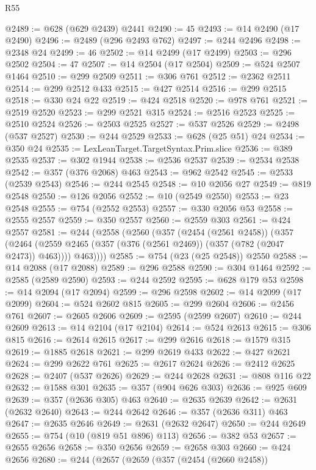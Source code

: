 \begin{lexlean}{R55}
\begin{coremodule}
@2489 := @628 (@629 @2439) @2441
@2490 := 45
@2493 := @14 @2490 (@17 @2490)
@2496 := @2489 (@296 @2493 @762)
@2497 := @244 @2496
@2498 := @2348 @24
@2499 := 46
@2502 := @14 @2499 (@17 @2499)
@2503 := @296 @2502
@2504 := 47
@2507 := @14 @2504 (@17 @2504)
@2509 := @524 @2507 @1464
@2510 := @299 @2509
@2511 := @306 @761
@2512 := @2362 @2511
@2514 := @299 @2512 @433
@2515 := @427 @2514
@2516 := @299 @2515
@2518 := @330 @24 @22
@2519 := @424 @2518
@2520 := @978 @761
@2521 := @2519 @2520
@2523 := @299 @2521 @315
@2524 := @2516 @2523
@2525 := @2510 @2524
@2526 := @2503 @2525
@2527 := @537 @2526
@2529 := @2498 (@537 @2527)
@2530 := @244 @2529
@2533 := @628 (@25 @51) @24
@2534 := @350 @24
@2535 := LexLeanTarget.TargetSyntax.Prim.slice
@2536 := @389 @2535
@2537 := @302 @1944
@2538 := @2536 @2537
@2539 := @2534 @2538
@2542 := @357 (@376 @2068) @463
@2543 := @962 @2542
@2545 := @2533 (@2539 @2543)
@2546 := @244 @2545
@2548 := @10 @2056 @27
@2549 := @819 @2548
@2550 := @126 @2056
@2552 := @10 (@2549 @2550)
@2553 := @23 @2548
@2555 := @754 (@2552 @2553)
@2557 := @330 @2056 @53
@2558 := @2555 @2557
@2559 := @350 @2557
@2560 := @2559 @303
@2561 := @424 @2557
@2581 := @244
    (@2558
      (@2560
        (@357
          (@2454 (@2561 @2458))
          (@357
            (@2464 (@2559 @2465 (@357 (@376 (@2561 @2469)) (@357 (@782 (@2047 @2473)) @463))))
            @463))))
@2585 := @754 (@23 (@25 @2548)) @2550
@2588 := @14 @2088 (@17 @2088)
@2589 := @296 @2588
@2590 := @304 @1464
@2592 := @2585 (@2589 @2590)
@2593 := @244 @2592
@2595 := @628 @179 @53
@2598 := @14 @2094 (@17 @2094)
@2599 := @296 @2598
@2602 := @14 @2099 (@17 @2099)
@2604 := @524 @2602 @815
@2605 := @299 @2604
@2606 := @2456 @761
@2607 := @2605 @2606
@2609 := @2595 (@2599 @2607)
@2610 := @244 @2609
@2613 := @14 @2104 (@17 @2104)
@2614 := @524 @2613
@2615 := @306 @815
@2616 := @2614 @2615
@2617 := @299 @2616
@2618 := @1579 @315
@2619 := @1885 @2618
@2621 := @299 @2619 @433
@2622 := @427 @2621
@2624 := @299 @2622 @761
@2625 := @2617 @2624
@2626 := @2412 @2625
@2628 := @2407 (@537 @2626)
@2629 := @244 @2628
@2631 := @808 @116 @22
@2632 := @1588 @301
@2635 := @357 (@904 @626 @303)
@2636 := @925 @609
@2639 := @357 (@2636 @305) @463
@2640 := @2635 @2639
@2642 := @2631 (@2632 @2640)
@2643 := @244 @2642
@2646 := @357 (@2636 @311) @463
@2647 := @2635 @2646
@2649 := @2631 (@2632 @2647)
@2650 := @244 @2649
@2655 := @754 (@10 (@819 @51 @896) @113)
@2656 := @382 @53
@2657 := @2655 @2656
@2658 := @350 @2656
@2659 := @2658 @303
@2660 := @424 @2656
@2680 := @244
    (@2657
      (@2659
        (@357
          (@2454 (@2660 @2458))

\end{coremodule}
\end{lexlean}

